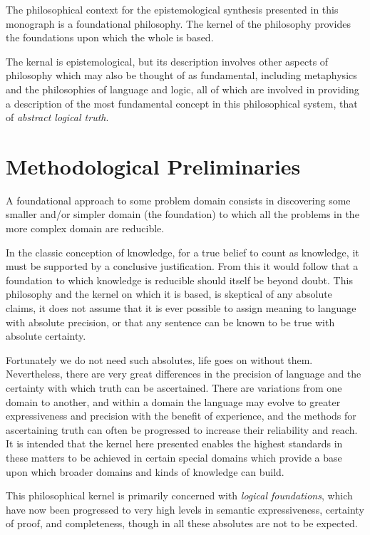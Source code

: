 The philosophical context for the epistemological synthesis presented in this monograph is a foundational philosophy.
The kernel of the philosophy provides the foundations upon which the whole is based.

The kernal is epistemological, but its description involves other aspects of philosophy which may also be thought of as fundamental, including metaphysics and the philosophies of language and logic, all of which are involved in providing a description of the most fundamental concept in this philosophical system, that of \emph{abstract logical truth}.

\section{Methodological Preliminaries}

A foundational approach to some problem domain consists in discovering some smaller and/or simpler domain (the foundation) to which all the problems in the more complex domain are reducible.

In the classic conception of knowledge, for a true belief to count as knowledge, it must be supported by a conclusive justification.
From this it would follow that a foundation to which knowledge is reducible should itself be beyond doubt.
This philosophy and the kernel on which it is based, is skeptical of any absolute claims, it does not assume that it is ever possible to assign meaning to language with absolute precision, or that any sentence can be known to be true with absolute certainty.

Fortunately we do not need such absolutes, life goes on without them.
Nevertheless, there are very great differences in the precision of language and the certainty with which truth can be ascertained.
There are variations from one domain to another, and within a domain the language may evolve to greater expressiveness and precision with the benefit of experience, and the methods for ascertaining truth can often be progressed to increase their reliability and reach.
It is intended that the kernel here presented enables the highest standards in these matters to be achieved in certain special domains which provide a base upon which broader domains and kinds of knowledge can build.

This philosophical kernel is primarily concerned with \emph{logical foundations}, which have now been progressed to very high levels in semantic expressiveness, certainty of proof, and completeness, though in all these absolutes are not to be expected.

